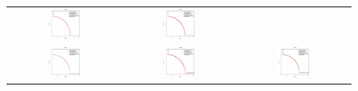 \begin{figure}
\begin{tabular}{ccc}
    \includegraphics[width=0.3\textwidth]{Figures_Chapter7/Results_Chapter5/WFG5.eps} &
    \includegraphics[width=0.3\textwidth]{Figures_Chapter7/Results_Chapter5/WFG6.eps} \\
    \includegraphics[width=0.3\textwidth]{Figures_Chapter7/Results_Chapter5/WFG7.eps} &
    \includegraphics[width=0.3\textwidth]{Figures_Chapter7/Results_Chapter5/WFG8.eps} &  
    \includegraphics[width=0.3\textwidth]{Figures_Chapter7/Results_Chapter5/WFG9.eps}  
 \end{tabular}
 \end{figure}


